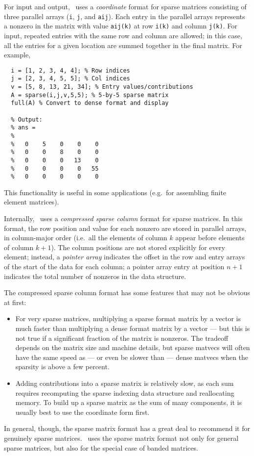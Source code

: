 For input and output, \matlab\ uses a {\em coordinate} format for
sparse matrices consisting of three parallel arrays ({\tt i}, {\tt j},
and {\tt aij}).  Each entry in the parallel arrays represents a
nonzero in the matrix with value {\tt aij(k)} at row {\tt i(k)} and
column {\tt j(k)}.  For input, repeated entries with the same row and
column are allowed; in this case, all the entries for a given location
are summed together in the final matrix.  For example,
\begin{lstlisting}
  i = [1, 2, 3, 4, 4]; % Row indices
  j = [2, 3, 4, 5, 5]; % Col indices
  v = [5, 8, 13, 21, 34]; % Entry values/contributions
  A = sparse(i,j,v,5,5); % 5-by-5 sparse matrix
  full(A) % Convert to dense format and display

  % Output:
  % ans =
  %
  %   0    5    0    0    0
  %   0    0    8    0    0
  %   0    0    0   13    0
  %   0    0    0    0   55
  %   0    0    0    0    0
\end{lstlisting}
This functionality is useful
in some applications (e.g.~for assembling finite element matrices).

Internally, \matlab\ uses a {\em compressed sparse column} format
for sparse matrices.  In this format, the row position and value for
each nonzero are stored in parallel arrays, in column-major
order (i.e.~all the elements of column $k$ appear before elements of
column $k+1$).  The column positions are not stored explicitly for
every element; instead, a {\em pointer array} indicates the offset
in the row and entry arrays of the start of the data for each column;
a pointer array entry at position $n+1$ indicates the total number
of nonzeros in the data structure.

The compressed sparse column format has some features that may not
be obvious at first:
\begin{itemize}
\item
  For very sparse matrices, multiplying a sparse format matrix by a
  vector is much faster than multiplying a dense format matrix by a
  vector --- but this is not true if a significant fraction of the
  matrix is nonzeros.  The tradeoff depends on the matrix size and
  machine details, but sparse matvecs will often have the same speed as ---
  or even be slower than --- dense matvecs when the sparsity is above a
  few percent.
\item
  Adding contributions into a sparse matrix is relatively slow,
  as each sum requires recomputing the sparse indexing data structure
  and reallocating memory.  To build up a sparse matrix as the sum of
  many components, it is usually best to use the coordinate form first.
\end{itemize}
In general, though, the sparse matrix format has a great deal to
recommend it for genuinely sparse matrices.  \matlab\ uses the sparse
matrix format not only for general sparse matrices, but also for the
special case of banded matrices.
